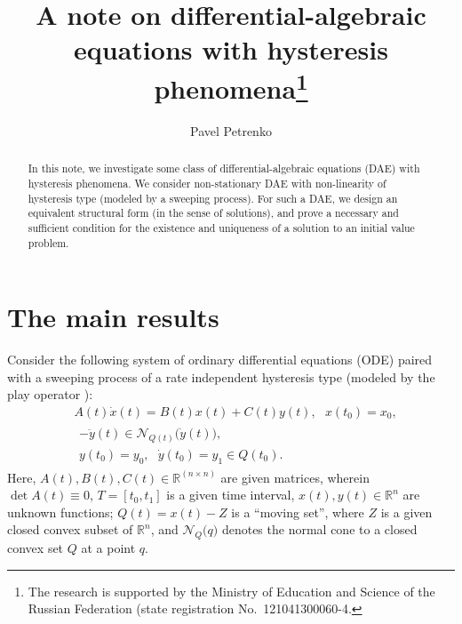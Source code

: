 \documentclass[12pt]{llncs}
\begin{document}
%
\fi

\title{A note on differential-algebraic equations with hysteresis phenomena\thanks{The research is supported by the Ministry of Education and Science of the Russian Federation (state registration No.~121041300060-4.}}
\author{Pavel Petrenko 
}


\maketitle

\begin{abstract}
In this note, we investigate some class of differential-algebraic equations (DAE) with hysteresis phenomena. We consider non-stationary DAE with non-linearity of hysteresis type (modeled by a sweeping process). For such a DAE, we design an equivalent structural form (in the sense of solutions), and prove a necessary and sufficient condition for the existence and uniqueness of a solution to an initial value problem.

\end{abstract}

\section{The main results}

Consider the following system of ordinary differential equations (ODE) paired with a sweeping process \cite{KM2000,Moreau1977} of a rate independent hysteresis type  (modeled by the play operator \cite{BS1996,Kr1991,PSS2020}):
\begin{align} \label{pss1}
 & A(t)\dot{x}(t)=B(t)x(t)+C(t)y(t), \ \ \ x(t_0)=x_0,   
\\[0.5em] & 
\begin{array}{c}
  -\ddot{y}(t)\in \mathcal{N}_{Q(t)}\big(\dot{y}(t)\big), \\[0.5em] 
 {y}(t_0)=y_0, \ \  \  \dot{y}(t_0)=y_1\in Q(t_0).  
  \end{array} \label{pss2}
\end{align}
Here, $A(t), B(t), C(t) \in \mathbb R^{(n\times n)}$ are given matrices, wherein $\det A(t) \equiv 0$, $T=[t_0,t_1]$ is a given time interval, $x(t), y(t) \in {\mathbb R}^n$ are unknown functions; $Q(t)=x(t)-Z$ is a ``moving set'', where $Z$ is a given closed convex subset of ${\mathbb R}^n$, and $\mathcal{N}_{Q}\big(q\big)$ denotes the normal cone to a closed convex set $Q$ at a point $q$.
\end{document}

